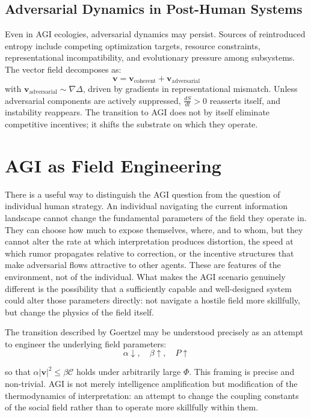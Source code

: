 \documentclass[12pt,a4paper]{article}
\begin{document}
\subsection{Adversarial Dynamics in Post-Human Systems}

Even in AGI ecologies, adversarial dynamics may persist. Sources of reintroduced entropy include competing optimization targets, resource constraints, representational incompatibility, and evolutionary pressure among subsystems. The vector field decomposes as:
\[
\mathbf{v} = \mathbf{v}_{\text{coherent}} + \mathbf{v}_{\text{adversarial}}
\]
with $\mathbf{v}_{\text{adversarial}} \sim \nabla \Delta$, driven by gradients in representational mismatch. Unless adversarial components are actively suppressed, $\frac{dS}{dt} > 0$ reasserts itself, and instability reappears. The transition to AGI does not by itself eliminate competitive incentives; it shifts the substrate on which they operate.

\section{AGI as Field Engineering}

There is a useful way to distinguish the AGI question from the question of individual human strategy. An individual navigating the current information landscape cannot change the fundamental parameters of the field they operate in. They can choose how much to expose themselves, where, and to whom, but they cannot alter the rate at which interpretation produces distortion, the speed at which rumor propagates relative to correction, or the incentive structures that make adversarial flows attractive to other agents. These are features of the environment, not of the individual. What makes the AGI scenario genuinely different is the possibility that a sufficiently capable and well-designed system could alter those parameters directly: not navigate a hostile field more skillfully, but change the physics of the field itself.

The transition described by Goertzel may be understood precisely as an attempt to engineer the underlying field parameters:
\[
\alpha \downarrow, \quad \beta \uparrow, \quad P \uparrow
\]

so that $\alpha |\mathbf{v}|^2 \leq \beta \mathcal{C}$ holds under arbitrarily large $\Phi$. This framing is precise and non-trivial. AGI is not merely intelligence amplification but modification of the thermodynamics of interpretation: an attempt to change the coupling constants of the social field rather than to operate more skillfully within them.
\end{document}
